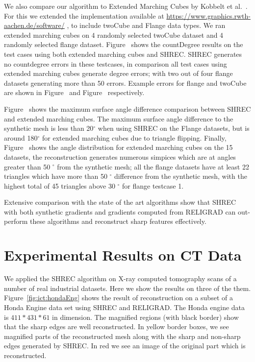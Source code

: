 We also compare our algorithm to Extended Marching Cubes by Kobbelt et al.~\cite{kbsh-fssev-01}. For this we extended the implementation available at \url{https://www.graphics.rwth-aachen.de/software/} \href{https://www.graphics.rwth-aachen.de/software/}{}, to include twoCube and Flange data types. We ran extended marching cubes on 4 randomly selected twoCube dataset and 4 randomly selected flange dataset. Figure~\protect{} shows the countDegree results on the test cases using both extended marching cubes and SHREC. SHREC generates no countdegree errors in these testcases, in comparison all test cases using extended marching cubes generate degree errors; with two out of four flange datasets generating more than 50 errors.
Example errors for flange and twoCube are shown in Figure~\protect{} and Figure~\protect{} respectively. 

Figure~\protect{} shows the maximum surface angle difference comparison between SHREC and extended marching cubes. The maximum surface angle difference to the synthetic mesh is less than 20$^\circ$ when using SHREC on the Flange datasets, but is around 180$^\circ$ for extended marching cubes due to triangle flipping. Finally, Figure~\protect{} shows the angle distribution for extended marching cubes on the 15 datasets, the reconstruction generates numerous simpices which are at angles greater than 50 $^\circ$ from the synthetic mesh; all the flange datasets have at least 22 triangles which have more than 50  $^\circ$ difference from the synthetic mesh, with the highest total of 45 triangles above 30 $^\circ$ for flange testcase 1.


Extensive comparison with the state of the art algorithms show that SHREC with both synthetic gradients and gradients computed from RELIGRAD can out-perform these algorithms and reconstruct sharp features effectively. 


\section{Experimental Results on CT Data}
We applied the SHREC algorithm on X-ray computed tomography scans of a number of real industrial datasets. Here we show the results on three of the them. 
Figure~\ref{fig:ict:hondaEng} shows the result of reconstruction on a subset of a Honda Engine data set using SHREC and RELIGRAD. The Honda engine data is $411*431*61$ in dimension. The magnified regions (with black border) show that the sharp edges are well reconstructed. In yellow border boxes, we see magnified parts of the  reconstructed mesh along with the sharp and non-sharp edges generated by SHREC. In red we see an image of the original part which is reconstructed. 


